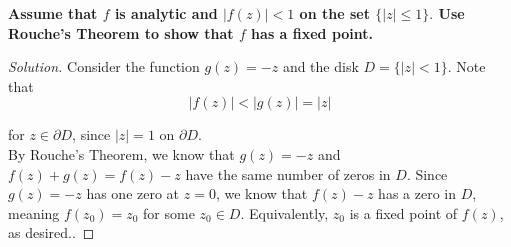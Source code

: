 \documentclass[11pt]{article}
\newenvironment{solution}
  {\renewcommand\qedsymbol{$\blacksquare$}\begin{proof}[Solution]}
  {\end{proof}}
\theoremstyle{definition}
\begin{document}
\textbf{Assume that $f$ is analytic and $|f(z)| < 1$ on the set $\{ |z| \leq 1\}.$ Use Rouche's Theorem to show that $f$ has a fixed point. }

\begin{solution}
Consider the function $g(z) = -z$ and the disk $D = \{ |z| < 1\}.$ Note that
\[ |f(z)| < |g(z)| = |z|\]

for $z \in \partial D$, since $|z| = 1$ on $\partial D.$ \\

By Rouche's Theorem, we know that $g(z) = -z$ and $f(z) + g(z) = f(z) - z$ have the same number of zeros in $D$. Since $g(z)= -z$ has one zero at $z=0$, we know that $f(z) - z$ has a zero in $D$, meaning $f(z_0) = z_0$ for some $z_0 \in D$. Equivalently, $z_0$ is a fixed point of $f(z)$, as desired..\end{solution}
\end{document}
